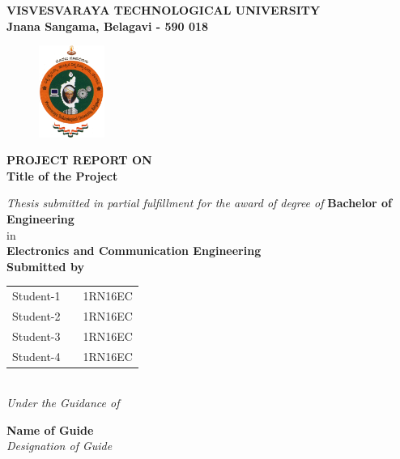 
\begin{titlingpage}
\thispagestyle{empty}\centering

\setlength{\toptafiddle}{1in}
\setlength{\bottafiddle}{1in}
\vspace*{-1.25in}
\enlargethispage{\toptafiddle}
\large 
\textbf{VISVESVARAYA TECHNOLOGICAL UNIVERSITY\\
	Jnana Sangama, Belagavi - 590 018}\\
\vspace{0.2cm}
\begin{figure}[h]
\centering
\includegraphics[height=3cm]{images/vtu.png}
\end{figure}
{\textbf{PROJECT REPORT ON}}\\

\Huge{\textbf{\color{red}Title of the Project}}
\vspace{0.5cm}

\large \textit{Thesis submitted in partial fulfillment for the award of degree of }{\textbf{Bachelor of Engineering}}\\
in \\\textbf{Electronics and Communication Engineering}
\vspace{0.5cm}\\
{\textbf{Submitted by}}


\begin{tabular}{ccc}

Student-1 & \hspace{5cm}  &1RN16EC\\
Student-2 &   &1RN16EC\\
Student-3 &   &1RN16EC\\
Student-4 &   &1RN16EC\\

\end{tabular}
\vspace{0.5cm}\\
\textit{Under the Guidance of}


\Large{\textbf{Name of Guide}}\\
\textit{Designation of Guide}\\


\end{titlingpage}
